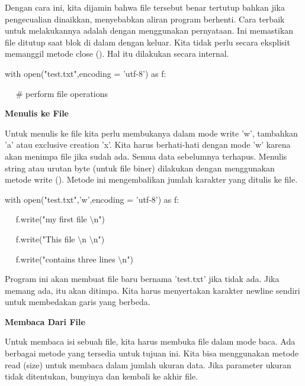 Dengan cara ini, kita dijamin bahwa file tersebut benar tertutup bahkan jika pengecualian dinaikkan, menyebabkan aliran program berhenti. Cara terbaik untuk melakukannya adalah dengan menggunakan pernyataan. Ini memastikan file ditutup saat blok di dalam dengan keluar. Kita tidak perlu secara eksplisit memanggil metode close (). Hal itu dilakukan secara internal. \par
\vspace{12pt}
\noindent 
with open("test.txt",encoding = 'utf-8') as f: \par
\noindent 
~~  $  \#  $ perform file operations \par
\vspace{12pt}
\noindent 
{\fontsize{14pt}{14pt}\selectfont \textbf{Menulis ke File} \\} \par
Untuk menulis ke file kita perlu membukanya dalam mode write 'w', tambahkan 'a' atau exclusive creation 'x'. Kita harus berhati-hati dengan mode 'w' karena akan menimpa file jika sudah ada. Semua data sebelumnya terhapus. Menulis string atau urutan byte (untuk file biner) dilakukan dengan menggunakan metode write (). Metode ini mengembalikan jumlah karakter yang ditulis ke file. \par
\vspace{12pt}
\noindent 
with open("test.txt",'w',encoding = 'utf-8') as f: \par
\noindent 
~~ f.write("my first file $  \setminus  $n") \par
\noindent 
~~ f.write("This file $  \setminus  $n $  \setminus  $n") \par
\noindent 
~~ f.write("contains three lines $  \setminus  $n") \par
\vspace{12pt}
Program ini akan membuat file baru bernama 'test.txt' jika tidak ada. Jika memang ada, itu akan ditimpa. Kita harus menyertakan karakter newline sendiri untuk membedakan garis yang berbeda. \par
\vspace{12pt}
\noindent 
{\fontsize{14pt}{14pt}\selectfont \textbf{Membaca Dari File} \\} \par
\vspace{12pt}
Untuk membaca isi sebuah file, kita harus membuka file dalam mode baca. Ada berbagai metode yang tersedia untuk tujuan ini. Kita bisa menggunakan metode read (size) untuk membaca dalam jumlah ukuran data. Jika parameter ukuran tidak ditentukan, bunyinya dan kembali ke akhir file. \par
